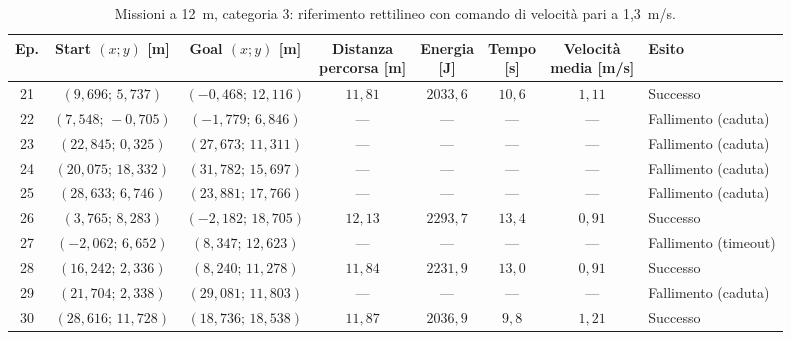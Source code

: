 \begin{table}[H]
\centering
\caption{Missioni a 12~m, categoria 3: riferimento rettilineo con comando di velocità pari a 1,3~m/s.}
\label{tab:straight-line-1-3-12m-cat3}
\begingroup
\fontsize{9}{11}\selectfont
\setlength{\tabcolsep}{2.5pt}
\renewcommand{\arraystretch}{1.2}
\begin{tabular}{@{}c cc cccc l@{}}
\toprule
Ep. & \shortstack{Start $(x;y)$\\{}[m]} & \shortstack{Goal $(x;y)$\\{}[m]} & \shortstack{Distanza\\percorsa [m]} & \shortstack{Energia\\{}[J]} & \shortstack{Tempo\\{}[s]} & \shortstack{Velocità\\media [m/s]} & Esito \\
\midrule
21 & $(9{,}696;\,5{,}737)$ & $(-0{,}468;\,12{,}116)$ & $11{,}81$ & $2033{,}6$ & $10{,}6$ & $1{,}11$ & Successo \\
22 & $(7{,}548;\,-0{,}705)$ & $(-1{,}779;\,6{,}846)$ & --- & --- & --- & --- & Fallimento (caduta) \\
23 & $(22{,}845;\,0{,}325)$ & $(27{,}673;\,11{,}311)$ & --- & --- & --- & --- & Fallimento (caduta) \\
24 & $(20{,}075;\,18{,}332)$ & $(31{,}782;\,15{,}697)$ & --- & --- & --- & --- & Fallimento (caduta) \\
25 & $(28{,}633;\,6{,}746)$ & $(23{,}881;\,17{,}766)$ & --- & --- & --- & --- & Fallimento (caduta) \\
26 & $(3{,}765;\,8{,}283)$ & $(-2{,}182;\,18{,}705)$ & $12{,}13$ & $2293{,}7$ & $13{,}4$ & $0{,}91$ & Successo \\
27 & $(-2{,}062;\,6{,}652)$ & $(8{,}347;\,12{,}623)$ & --- & --- & --- & --- & Fallimento (timeout) \\
28 & $(16{,}242;\,2{,}336)$ & $(8{,}240;\,11{,}278)$ & $11{,}84$ & $2231{,}9$ & $13{,}0$ & $0{,}91$ & Successo \\
29 & $(21{,}704;\,2{,}338)$ & $(29{,}081;\,11{,}803)$ & --- & --- & --- & --- & Fallimento (caduta) \\
30 & $(28{,}616;\,11{,}728)$ & $(18{,}736;\,18{,}538)$ & $11{,}87$ & $2036{,}9$ & $9{,}8$ & $1{,}21$ & Successo \\
\bottomrule
\end{tabular}
\endgroup
\end{table}

